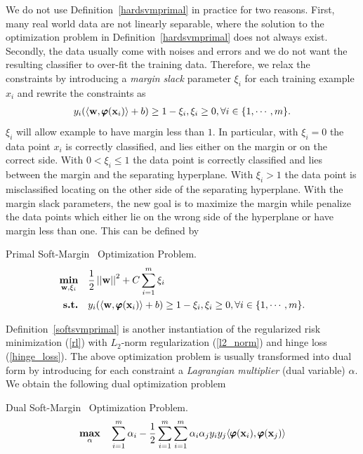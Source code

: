 {%
We do not use Definition~\ref{hardsvmprimal} in practice for two reasons. 
First, many real world data are not linearly separable, where the solution to the optimization problem in Definition~\ref{hardsvmprimal} does not always exist.
Secondly, the data usually come with noises and errors and we do not want the resulting classifier to over-fit the training data.
Therefore, we relax the constraints by introducing a \textit{margin slack} parameter $\xi_i$ for each training example $x_i$ and rewrite the constraints as 
\begin{align}
	y_i(\langle \mathbf {w}, \pmb \varphi(\mathbf {x}_i) \rangle + b) \ge 1-\xi_i, \xi_i\ge 0, \forall i\in\{1,\cdots,m\}. \label{softsvmconstraint}
\end{align}
$\xi_i$ will allow example to have margin less than $1$.
In particular, with $\xi_i=0$ the data point $x_i$ is correctly classified, and lies either on the margin or on the correct side.
With $0<\xi_i\le 1$ the data point is correctly classified and lies between the margin and the separating hyperplane.
With $\xi_i>1$ the data point is misclassified locating on the other side of the separating hyperplane.
With the margin slack parameters, the new goal is to maximize the margin while penalize the data points which either lie on the wrong side of the hyperplane or have margin less than one.
This can be defined by
\begin{definition}{Primal Soft-Margin \svm\ Optimization Problem.}\label{softsvmprimal}
	\begin{align*}
		\underset{\mathbf {w},\xi_i}{\textbf{min}} & \quad\frac{1}{2}\left|\left| \mathbf {w} \right|\right|^2 + C\sum_{i=1}^{m}\xi_i\\
		\textbf{s.t.} & \quad y_i(\langle \mathbf {w}, \pmb \varphi(\mathbf {x}_i) \rangle + b) \ge 1-\xi_i, \xi_i\ge 0, \forall i\in\{1,\cdots,m\}.
	\end{align*}
\end{definition}
\noindent
Definition~\ref{softsvmprimal} is another instantiation of the regularized risk minimization (\ref{rl}) with $L_2$-norm regularization (\ref{l2_norm}) and hinge loss (\ref{hinge_loss}).
The above optimization problem is usually transformed into dual form by introducing for each constraint a \textit{Lagrangian multiplier} (dual variable) $\alpha$.
We obtain the following dual optimization problem
\begin{definition}{Dual Soft-Margin \svm\ Optimization Problem.}\label{softsvmdual}
	\begin{align*}
		\underset{\valpha}{\maximize} & \quad\sum_{i=1}^{m}\alpha_i -\frac{1}{2}\sum_{i=1}^{m}\sum_{i=1}^{m}\alpha_i\alpha_jy_iy_j\ip{\varphib(\vx_i)}{\varphib(\vx_j)}\\

\end{align*}
\end{definition}}

